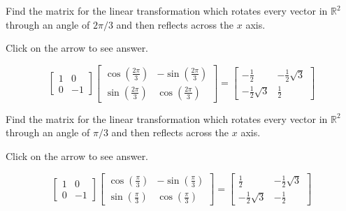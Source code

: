 \documentclass{ximera}
\begin{document}
\begin{problem}\label{prb:6.16} Find the matrix for the linear transformation which rotates every
vector in $\mathbb{R}^{2}$ through an angle of $2\pi /3$ and then reflects
across the $x$ axis.

Click on the arrow to see answer.
\begin{expandable}
\[
\left[
\begin{array}{rr}
1 & 0 \\
0 & -1
\end{array}
\right] \left[
\begin{array}{cc}
\cos \left( \frac{2\pi }{3}\right)  & -\sin \left( \frac{2\pi }{3}\right)
\\
\sin \left( \frac{2\pi }{3}\right)  & \cos \left( \frac{2\pi }{3}\right)
\end{array}
\right] = \left[
\begin{array}{cc}
-\frac{1}{2} & -\frac{1}{2}\sqrt{3} \\
-\frac{1}{2}\sqrt{3} & \frac{1}{2}
\end{array}
\right]
\]
\end{expandable}
\end{problem}

\begin{problem}\label{prb:6.17} Find the matrix for the linear transformation which rotates every
vector in $\mathbb{R}^{2}$ through an angle of $\pi /3$ and then reflects
across the $x$ axis.

Click on the arrow to see answer.
\begin{expandable}
\[
\left[
\begin{array}{rr}
1 & 0 \\
0 & -1
\end{array}
\right] \left[
\begin{array}{cc}
\cos \left( \frac{\pi }{3}\right)  & -\sin \left( \frac{\pi }{3}\right)  \\
\sin \left( \frac{\pi }{3}\right)  & \cos \left( \frac{\pi }{3}\right)
\end{array}
\right] = \left[
\begin{array}{cc}
\frac{1}{2} & -\frac{1}{2}\sqrt{3} \\
-\frac{1}{2}\sqrt{3} & -\frac{1}{2}
\end{array}
\right]
\]
\end{expandable}
\end{problem}
\end{document}
